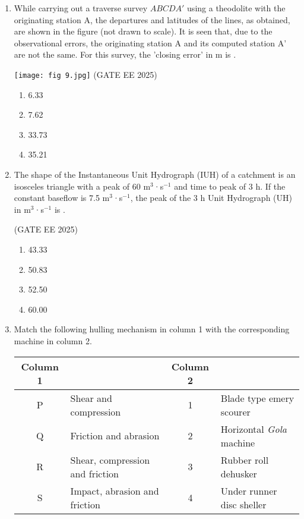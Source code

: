 \documentclass[journal,12pt,onecolumn]{IEEEtran}
\theoremstyle{remark}
\begin{document}
\begin{enumerate}
\item While carrying out a traverse survey $ABCDA'$ using a theodolite with the originating station A, the departures and latitudes of the lines, as obtained, are shown in the figure (not drawn to scale). It is seen that, due to the observational errors, the originating station A and its computed station A' are not the same. For this survey, the 'closing error' in m is .

 \texttt{[image: fig 9.jpg]}
\hfill(GATE EE 2025)

\begin{multicols}{4}
\begin{enumerate}
\item 6.33
\item 7.62
\item 33.73
\item 35.21
\end{enumerate}
\end{multicols}

\item The shape of the Instantaneous Unit Hydrograph (IUH) of a catchment is an isosceles triangle with a peak of 60 m$^{3}$·s$^{-1}$ and time to peak of 3 h. If the constant baseflow is 7.5 m$^{3}$·s$^{-1}$, the peak of the 3 h Unit Hydrograph (UH) in m$^{3}$·s$^{-1}$ is .

\hfill(GATE EE 2025)

\begin{multicols}{4}
\begin{enumerate}
\item 43.33
\item 50.83
\item 52.50
\item 60.00
\end{enumerate}
\end{multicols}

\item Match the following hulling mechanism in column 1 with the corresponding machine in column 2.  

\begin{center}
\begin{tabular}{|c|l|c|l|}
\hline
\textbf{Column 1} & & \textbf{Column 2} & \\ \hline
P & Shear and compression & 1 & Blade type emery scourer \\ \hline
Q & Friction and abrasion & 2 & Horizontal \textit{Gola} machine \\ \hline
R & Shear, compression and friction & 3 & Rubber roll dehusker \\ \hline
S & Impact, abrasion and friction & 4 & Under runner disc sheller \\ \hline
\end{tabular}
\end{center}


\end{enumerate}
\end{document}
